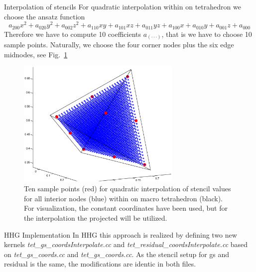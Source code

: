 \documentclass[a4paper,11pt,reqno]{amsart}
\numberwithin{figure}{section}
\numberwithin{table}{section}
\begin{document}

\begin{section}{Interpolation of stencils}
For quadratic interpolation within on tetrahedron we choose the ansatz function
\begin{equation}
\label{eq:quadraticPolynomial}
a_{200}x^2 + a_{020}y^2 + a_{002}z^2 + a_{110}xy + a_{101}xz + a_{011}yz + 
a_{100}x + a_{010}y + a_{001}z + a_{000}
\end{equation}
Therefore we have to compute 10 coefficients $a_{(\cdot\cdot\cdot)}$, that is we
have to choose 10 sample points. Naturally, we choose the four corner nodes plus the six
edge midnodes, see Fig.~\ref{fig:samplePoints}

\begin{figure}\centering
\includegraphics[width=0.7\textwidth]{pics/tetSamplePoints} 
\caption{Ten sample points (red) for quadratic interpolation of stencil values for 
all interior nodes (blue) within on macro tetrahedron (black). For visualization,
the constant coordinates have been used, but for the interpolation the projected
will be utilized.}
\label{fig:samplePoints}
\end{figure}  


\begin{subsection}{HHG Implementation}
In HHG this approach is realized by defining two new kernels 
\emph{tet\_gs\_coordsInterpolate.cc}
and \emph{tet\_residual\_coordsInterpolate.cc} based on \emph{tet\_gs\_coords.cc} and 
\emph{tet\_gs\_coords.cc}. As the stencil setup for gs and residual is the same, 
the modifications are identic in both files.


\end{subsection}
\end{section}
\end{document}
